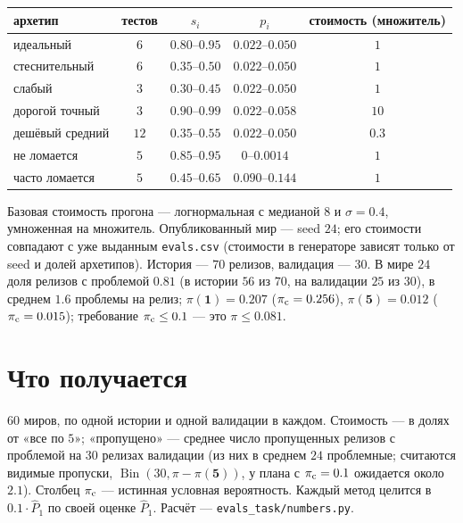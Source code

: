 \documentclass[11pt,a4paper]{article}
\newcommand{\Bin}{\operatorname{Bin}}
\theoremstyle{plain}
\theoremstyle{definition}
\begin{document}
\begin{center}\small
\begin{tabular}{@{}lcccc@{}}
\toprule
архетип & тестов & $s_i$ & $p_i$ & стоимость (множитель) \\
\midrule
идеальный & $6$ & $0.80$--$0.95$ & $0.022$--$0.050$ & $1$ \\
стеснительный & $6$ & $0.35$--$0.50$ & $0.022$--$0.050$ & $1$ \\
слабый & $3$ & $0.30$--$0.45$ & $0.022$--$0.050$ & $1$ \\
дорогой точный & $3$ & $0.90$--$0.99$ & $0.022$--$0.058$ & $10$ \\
дешёвый средний & $12$ & $0.35$--$0.55$ & $0.022$--$0.050$ & $0.3$ \\
не ломается & $5$ & $0.85$--$0.95$ & $0$--$0.0014$ & $1$ \\
часто ломается & $5$ & $0.45$--$0.65$ & $0.090$--$0.144$ & $1$ \\
\bottomrule
\end{tabular}
\end{center}

Базовая стоимость прогона --- логнормальная с медианой $8$ и $\sigma=0.4$, умноженная на множитель. Опубликованный мир --- seed $24$; его стоимости совпадают с уже выданным \texttt{evals.csv} (стоимости в генераторе зависят только от seed и долей архетипов). История --- $70$ релизов, валидация --- $30$. В мире $24$ доля релизов с проблемой $0.81$ (в истории $56$ из $70$, на валидации $25$ из $30$), в среднем $1.6$ проблемы на релиз; $\pi(\mathbf1)=0.207$ ($\pi_{\rm c}=0.256$), $\pi(\mathbf5)=0.012$ ($\pi_{\rm c}=0.015$); требование $\pi_{\rm c}\le0.1$ --- это $\pi\le0.081$.

\section{Что получается}

$60$ миров, по одной истории и одной валидации в каждом. Стоимость --- в долях от «все по $5$»; «пропущено» --- среднее число пропущенных релизов с проблемой на $30$ релизах валидации (из них в среднем $24$ проблемные; считаются видимые пропуски, $\Bin(30,\pi-\pi(\mathbf5))$, у плана с $\pi_{\rm c}=0.1$ ожидается около $2.1$). Столбец $\pi_{\rm c}$ --- истинная условная вероятность. Каждый метод целится в $0.1\cdot\hat P_1$ по своей оценке $\hat P_1$. Расчёт --- \texttt{evals\_task/numbers.py}.
\end{document}
